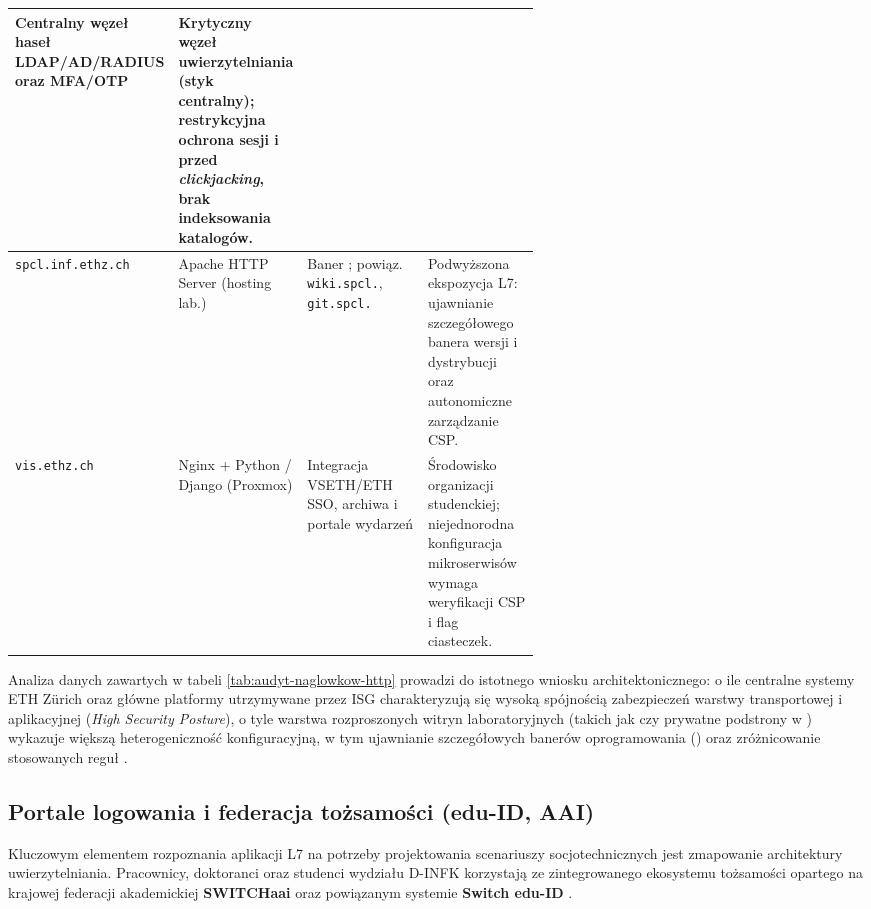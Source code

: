 {{\begin{table}[htbp]
\begin{tabularx}{\linewidth}{L{0.20\linewidth} L{0.18\linewidth} L{0.23\linewidth} Y}
        Centralny węzeł haseł LDAP/AD/RADIUS oraz MFA/OTP &
        Krytyczny węzeł uwierzytelniania (styk centralny); restrykcyjna ochrona sesji i przed \textit{clickjacking}, brak indeksowania katalogów. \\
        \midrule
        \nolinkurl{spcl.inf.ethz.ch} &
        Apache HTTP Server (hosting lab.) &
        Baner ; powiąz. \nolinkurl{wiki.spcl.}, \nolinkurl{git.spcl.} &
        Podwyższona ekspozycja L7: ujawnianie szczegółowego banera wersji i dystrybucji oraz autonomiczne zarządzanie CSP. \\
        \midrule
        \nolinkurl{vis.ethz.ch} &
        Nginx + Python / Django (Proxmox) &
        Integracja VSETH/ETH SSO, archiwa i portale wydarzeń &
        Środowisko organizacji studenckiej; niejednorodna konfiguracja mikroserwisów wymaga weryfikacji CSP i flag ciasteczek. \\
        \bottomrule
    \end{tabularx}
\end{table}

Analiza danych zawartych w tabeli \ref{tab:audyt-naglowkow-http} prowadzi do istotnego wniosku architektonicznego: o ile centralne systemy ETH Zürich oraz główne platformy utrzymywane przez ISG charakteryzują się wysoką spójnością zabezpieczeń warstwy transportowej i aplikacyjnej (\textit{High Security Posture}), o tyle warstwa rozproszonych witryn laboratoryjnych (takich jak  czy prywatne podstrony w ) wykazuje większą heterogeniczność konfiguracyjną, w tym ujawnianie szczegółowych banerów oprogramowania () oraz zróżnicowanie stosowanych reguł .

\subsection{Portale logowania i federacja tożsamości (edu-ID, AAI)}\label{subsec:portale-uwierzytelniania}

Kluczowym elementem rozpoznania aplikacji L7 na potrzeby projektowania scenariuszy socjotechnicznych jest zmapowanie architektury uwierzytelniania. Pracownicy, doktoranci oraz studenci wydziału D-INFK korzystają ze zintegrowanego ekosystemu tożsamości opartego na krajowej federacji akademickiej \textbf{SWITCHaai} oraz powiązanym systemie \textbf{Switch edu-ID} \cite{switch_eduid}.

}}
